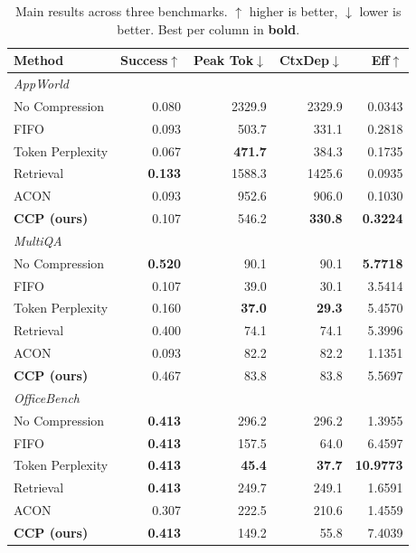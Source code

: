 \begin{table}[t]
  \centering
  \small
  \caption{Main results across three benchmarks. $\uparrow$ higher is better, $\downarrow$ lower is better. Best per column in \textbf{bold}.}
  \label{tab:main_results}
  \begin{tabular}{lrrrr}
    \toprule
    Method & Success$\uparrow$ & Peak Tok$\downarrow$ & CtxDep$\downarrow$ & Eff$\uparrow$ \\
    \midrule
    \multicolumn{5}{l}{\textit{AppWorld}} \\
    No Compression & 0.080 & 2329.9 & 2329.9 & 0.0343 \\
    FIFO & 0.093 & 503.7 & 331.1 & 0.2818 \\
    Token Perplexity & 0.067 & \textbf{471.7} & 384.3 & 0.1735 \\
    Retrieval & \textbf{0.133} & 1588.3 & 1425.6 & 0.0935 \\
    ACON & 0.093 & 952.6 & 906.0 & 0.1030 \\
    \textbf{CCP (ours)} & 0.107 & 546.2 & \textbf{330.8} & \textbf{0.3224} \\
    \midrule
    \multicolumn{5}{l}{\textit{MultiQA}} \\
    No Compression & \textbf{0.520} & 90.1 & 90.1 & \textbf{5.7718} \\
    FIFO & 0.107 & 39.0 & 30.1 & 3.5414 \\
    Token Perplexity & 0.160 & \textbf{37.0} & \textbf{29.3} & 5.4570 \\
    Retrieval & 0.400 & 74.1 & 74.1 & 5.3996 \\
    ACON & 0.093 & 82.2 & 82.2 & 1.1351 \\
    \textbf{CCP (ours)} & 0.467 & 83.8 & 83.8 & 5.5697 \\
    \midrule
    \multicolumn{5}{l}{\textit{OfficeBench}} \\
    No Compression & \textbf{0.413} & 296.2 & 296.2 & 1.3955 \\
    FIFO & \textbf{0.413} & 157.5 & 64.0 & 6.4597 \\
    Token Perplexity & \textbf{0.413} & \textbf{45.4} & \textbf{37.7} & \textbf{10.9773} \\
    Retrieval & \textbf{0.413} & 249.7 & 249.1 & 1.6591 \\
    ACON & 0.307 & 222.5 & 210.6 & 1.4559 \\
    \textbf{CCP (ours)} & \textbf{0.413} & 149.2 & 55.8 & 7.4039 \\
    \bottomrule
  \end{tabular}
\end{table}
